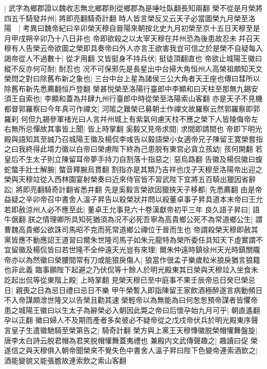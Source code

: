 |{
	武字為鄉郡證以魏收志無北鄉郡則從鄉郡為是唾吐臥翻長知兩翻}
榮不從是月榮將四五千騎發幷州|{
	將即亮翻騎奇計翻}
時人皆言榮反又云天子必當圖榮九月榮至洛陽　|{
	考異曰魏帝紀曰辛卯榮天穆自晉陽來朝按北史九月初榮至京十五日天穆至是月甲戌朔辛卯乃十八日非也}
帝即欲殺之以太宰天穆在幷州恐為後患故忍未幷召天穆有人告榮云帝欲圖之榮即具奏帝曰外人亦言王欲害我豈可信之於是榮不自疑每入謁帝從人不過數十|{
	從才用翻}
又皆挺身不持兵伏|{
	挺徒頂翻直也}
帝欲止城陽王徽曰縱不反亦何可耐|{
	耐忍也}
况不可保邪先是長星出中台掃大角恒州人高榮祖頗知天文榮問之對曰除舊布新之象也|{
	三台中台上星為諸侯三公大角者天王座也傳曰彗所以除舊布新先悉薦翻恒戶登翻}
榮甚悦榮至洛陽行臺郎中李顯和曰天柱至那無九錫安須王自索也|{
	李顯和蓋為幷肆九州行臺郎中時從榮至洛陽索山客翻}
亦是天子不見機都督郭羅察曰今年真可作禪文|{
	河隂之難榮已募朝士作禪文故羅察云然郭羅察即郭羅刹}
何但九錫參軍禇光曰人言幷州城上有紫氣何慮天柱不應之榮下人皆陵侮帝左右無所忌憚故其事皆上聞|{
	皆上時掌翻}
奚毅又見帝求間|{
	求間即請間也}
帝即下明光殿與語知其至誠乃召城陽王徽及楊侃李彧告以毅語榮小女適帝兄子陳留王寛榮嘗指之曰我終得此壻力徽以白帝曰榮慮陛下終為己患脱有東宫必貪立孩幼|{
	孩何開翻}
若皇后不生太子則立陳留耳帝夢手持刀自割落十指惡之|{
	惡烏路翻}
告徽及楊侃徽曰蝮蛇螫手壯士解腕|{
	螫音釋腕烏貫翻}
割指亦是其類乃吉祥也戊子天穆至洛陽帝出迎之榮與天穆竝從入西林園宴射榮奏曰近來侍官皆不習武陛下宜將五百騎出獵因省辭訟|{
	將即亮翻騎奇計翻省悉井翻}
先是奚毅言榮欲因獵挾天子移都|{
	先悉薦翻}
由是帝益疑之辛卯帝召中書舍人溫子昇告以殺榮狀并問以殺董卓事子昇具道本末帝曰王允若即赦涼州人必不應至此|{
	董卓王允事見六十卷漢獻帝初平三年}
良久語子昇曰|{
	語牛倨翻}
朕之情理卿所具知死猶須為况不必死吾寧為高貴鄉公死不為常道鄉公生|{
	謂曹魏高貴鄉公欲誅司馬昭不克而死常道鄉公禪位于晉而生也}
帝謂殺榮天穆即赦其黨皆應不動應詔王道習曰爾朱世隆司馬子如朱元龍特為榮所委任具知天下虛實謂不宜留徽及楊侃皆曰若世隆不全仲遠天光豈有來理|{
	爾朱仲遠時鎮徐州天光時鎮關隴}
帝亦以為然徽曰榮腰間常有刀或能狼戾傷人|{
	狼當作很孟子樂歲粒米狼戾猶言狼籍也非此義}
臨事願陛下起避之乃伏侃等十餘人於明光殿東其日榮與天穆竝入坐食未訖起出侃等從東階上殿|{
	上時掌翻}
見榮天穆已至中庭事不果壬辰帝忌日癸巳榮忌日|{
	親喪之日為忌日禮曰忌日不樂}
甲午榮暫入即詣陳留王家飲酒極醉遂言病動頻日不入帝謀頗泄世隆又以告榮且勸其速榮輕帝以為無能為曰何怱怱預帝謀者皆懼帝患之城陽王徽曰以生太子為辭榮必入朝因此斃之帝曰后懷孕始九月可乎|{
	朝直遙翻孕以正翻}
徽曰婦人不及期而產者多矣彼必不疑帝從之戊戍帝伏兵於明光殿東序聲言皇子生遣徽馳騎至榮第告之|{
	騎奇計翻}
榮方與上黨王天穆慱徽脱榮帽懽舞盤旋|{
	唐李太白詩云脱君帽為君笑脱帽懽舞蓋夷禮也}
兼殿内文武傳聲趣之|{
	趣讀曰促}
榮遂信之與天穆俱入朝帝聞榮來不覺失色中書舍人溫子昇曰陛下色變帝連索酒飲之|{
	酒能變貌又能張膽故連索飲之索山客翻}

